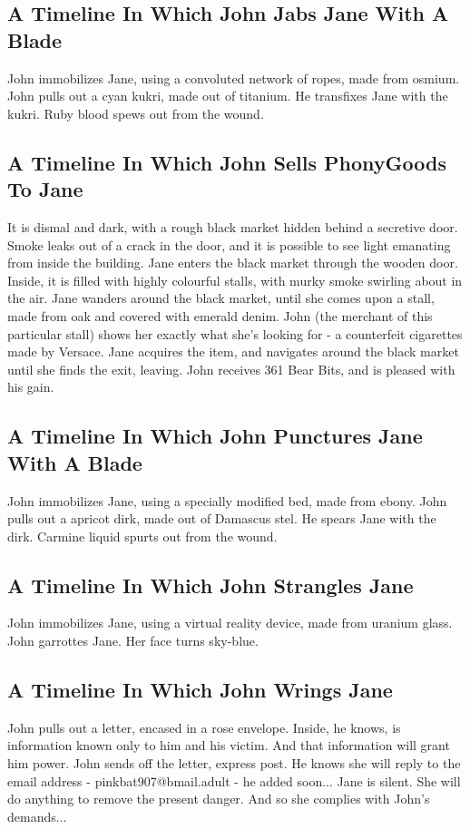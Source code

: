 \documentclass{article}
\begin{document}
\subsection{A Timeline In Which John Jabs Jane With A Blade}


John immobilizes Jane, using a convoluted network of ropes, made from osmium.
John pulls out a cyan kukri, made out of titanium.
He transfixes Jane with the kukri.
Ruby blood spews out from the wound.
\subsection{A Timeline In Which John Sells PhonyGoods To Jane}


It is dismal and dark, with a rough black market hidden behind a secretive door.
Smoke leaks out of a crack in the door, and it is possible to see light emanating from inside the building.
Jane enters the black market through the wooden door.
Inside, it is filled with highly colourful stalls, with murky smoke swirling about in the air.
Jane wanders around the black market, until she comes upon a stall, made from oak and covered with emerald denim.
John (the merchant of this particular stall) shows her exactly what she's looking for {-} a counterfeit cigarettes made by Versace.
Jane acquires the item, and navigates around the black market until she finds the exit, leaving.
John receives 361 Bear Bits, and is pleased with his gain.
\subsection{A Timeline In Which John Punctures Jane With A Blade}


John immobilizes Jane, using a specially modified bed, made from ebony.
John pulls out a apricot dirk, made out of Damascus stel.
He spears Jane with the dirk.
Carmine liquid spurts out from the wound.
\subsection{A Timeline In Which John Strangles Jane}


John immobilizes Jane, using a virtual reality device, made from uranium glass.
John garrottes Jane.
Her face turns sky{-}blue.
\subsection{A Timeline In Which John Wrings Jane}


John pulls out a letter, encased in a rose envelope. Inside, he knows, is information known only to him and his victim. And that information will grant him power.
John sends off the letter, express post. He knows she will reply to the email address {-} pinkbat907@bmail.adult {-} he added soon...
Jane is silent. She will do anything to remove the present danger. And so she complies with John's demands...
\end{document}
